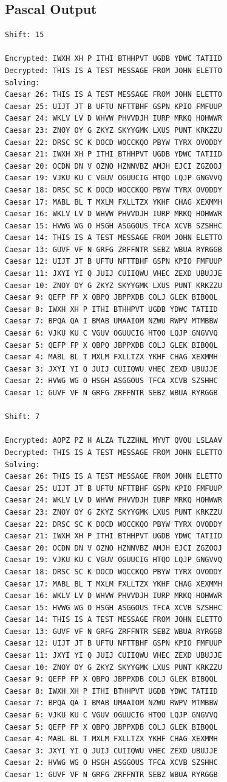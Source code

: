\documentclass{report}
\begin{document}
\subsection*{Pascal Output}
\begin{lstlisting}
Shift: 15

Encrypted: IWXH XH P ITHI BTHHPVT UGDB YDWC TATIID
Decrypted: THIS IS A TEST MESSAGE FROM JOHN ELETTO
Solving:
Caesar 26: THIS IS A TEST MESSAGE FROM JOHN ELETTO
Caesar 25: UIJT JT B UFTU NFTTBHF GSPN KPIO FMFUUP
Caesar 24: WKLV LV D WHVW PHVVDJH IURP MRKQ HOHWWR
Caesar 23: ZNOY OY G ZKYZ SKYYGMK LXUS PUNT KRKZZU
Caesar 22: DRSC SC K DOCD WOCCKQO PBYW TYRX OVODDY
Caesar 21: IWXH XH P ITHI BTHHPVT UGDB YDWC TATIID
Caesar 20: OCDN DN V OZNO HZNNVBZ AMJH EJCI ZGZOOJ
Caesar 19: VJKU KU C VGUV OGUUCIG HTQO LQJP GNGVVQ
Caesar 18: DRSC SC K DOCD WOCCKQO PBYW TYRX OVODDY
Caesar 17: MABL BL T MXLM FXLLTZX YKHF CHAG XEXMMH
Caesar 16: WKLV LV D WHVW PHVVDJH IURP MRKQ HOHWWR
Caesar 15: HVWG WG O HSGH ASGGOUS TFCA XCVB SZSHHC
Caesar 14: THIS IS A TEST MESSAGE FROM JOHN ELETTO
Caesar 13: GUVF VF N GRFG ZRFFNTR SEBZ WBUA RYRGGB
Caesar 12: UIJT JT B UFTU NFTTBHF GSPN KPIO FMFUUP
Caesar 11: JXYI YI Q JUIJ CUIIQWU VHEC ZEXD UBUJJE
Caesar 10: ZNOY OY G ZKYZ SKYYGMK LXUS PUNT KRKZZU
Caesar 9: QEFP FP X QBPQ JBPPXDB COLJ GLEK BIBQQL
Caesar 8: IWXH XH P ITHI BTHHPVT UGDB YDWC TATIID
Caesar 7: BPQA QA I BMAB UMAAIOM NZWU RWPV MTMBBW
Caesar 6: VJKU KU C VGUV OGUUCIG HTQO LQJP GNGVVQ
Caesar 5: QEFP FP X QBPQ JBPPXDB COLJ GLEK BIBQQL
Caesar 4: MABL BL T MXLM FXLLTZX YKHF CHAG XEXMMH
Caesar 3: JXYI YI Q JUIJ CUIIQWU VHEC ZEXD UBUJJE
Caesar 2: HVWG WG O HSGH ASGGOUS TFCA XCVB SZSHHC
Caesar 1: GUVF VF N GRFG ZRFFNTR SEBZ WBUA RYRGGB

Shift: 7

Encrypted: AOPZ PZ H ALZA TLZZHNL MYVT QVOU LSLAAV
Decrypted: THIS IS A TEST MESSAGE FROM JOHN ELETTO
Solving:
Caesar 26: THIS IS A TEST MESSAGE FROM JOHN ELETTO
Caesar 25: UIJT JT B UFTU NFTTBHF GSPN KPIO FMFUUP
Caesar 24: WKLV LV D WHVW PHVVDJH IURP MRKQ HOHWWR
Caesar 23: ZNOY OY G ZKYZ SKYYGMK LXUS PUNT KRKZZU
Caesar 22: DRSC SC K DOCD WOCCKQO PBYW TYRX OVODDY
Caesar 21: IWXH XH P ITHI BTHHPVT UGDB YDWC TATIID
Caesar 20: OCDN DN V OZNO HZNNVBZ AMJH EJCI ZGZOOJ
Caesar 19: VJKU KU C VGUV OGUUCIG HTQO LQJP GNGVVQ
Caesar 18: DRSC SC K DOCD WOCCKQO PBYW TYRX OVODDY
Caesar 17: MABL BL T MXLM FXLLTZX YKHF CHAG XEXMMH
Caesar 16: WKLV LV D WHVW PHVVDJH IURP MRKQ HOHWWR
Caesar 15: HVWG WG O HSGH ASGGOUS TFCA XCVB SZSHHC
Caesar 14: THIS IS A TEST MESSAGE FROM JOHN ELETTO
Caesar 13: GUVF VF N GRFG ZRFFNTR SEBZ WBUA RYRGGB
Caesar 12: UIJT JT B UFTU NFTTBHF GSPN KPIO FMFUUP
Caesar 11: JXYI YI Q JUIJ CUIIQWU VHEC ZEXD UBUJJE
Caesar 10: ZNOY OY G ZKYZ SKYYGMK LXUS PUNT KRKZZU
Caesar 9: QEFP FP X QBPQ JBPPXDB COLJ GLEK BIBQQL
Caesar 8: IWXH XH P ITHI BTHHPVT UGDB YDWC TATIID
Caesar 7: BPQA QA I BMAB UMAAIOM NZWU RWPV MTMBBW
Caesar 6: VJKU KU C VGUV OGUUCIG HTQO LQJP GNGVVQ
Caesar 5: QEFP FP X QBPQ JBPPXDB COLJ GLEK BIBQQL
Caesar 4: MABL BL T MXLM FXLLTZX YKHF CHAG XEXMMH
Caesar 3: JXYI YI Q JUIJ CUIIQWU VHEC ZEXD UBUJJE
Caesar 2: HVWG WG O HSGH ASGGOUS TFCA XCVB SZSHHC
Caesar 1: GUVF VF N GRFG ZRFFNTR SEBZ WBUA RYRGGB
\end{lstlisting}
\end{document}
